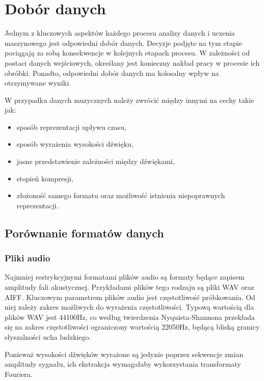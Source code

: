 \chapter {Dobór danych} 
{
    Jednym z kluczowych aspektów każdego procesu analizy danych i uczenia maszynowego
    jest odpowiedni dobór danych. Decyzje podjęte na tym etapie pociągają za sobą 
    konsekwencje w kolejnych etapach procesu. W zależności od postaci danych wejściowych,
    określany jest konieczny nakład pracy w procesie ich obróbki. 
    Ponadto, odpowiedni dobór danych ma kolosalny wpływ na otrzymywane wyniki.

    W przypadku danych muzycznych należy zwrócić między innymi na cechy takie jak:
    \begin{itemize}
        \item sposób reprezentacji upływu czasu,
        \item sposób wyrażenia wysokości dźwięku,
        \item jasne przedstawienie zależności między dźwiękami,
        \item stopień kompresji,
        \item złożoność samego formatu oraz możliwość istnienia niepoprawnych reprezentacji.
    \end{itemize}

    \section{Porównanie formatów danych}
    {
        \subsection{Pliki audio}
        {
            Najmniej restrykcyjnymi formatami plików audio są formaty będące zapisem
            amplitudy fali akustycznej. Przykładami plików tego rodzaju są pliki WAV
            oraz AIFF.
            Kluczowym parametrem plików audio jest częstotliwość próbkowania. Od niej
            zależy zakres możliwych do wyrażenia częstotliwości. Typową wartością dla plików
            WAV jest 44100Hz, co według twierdzenia Nyquista-Shannona przekłada się na zakres
            częstotliwości ograniczony wartością 22050Hz, będącą bliską granicy słyszalności
            ucha ludzkiego. 

            Ponieważ wysokości dźwięków wyrażone są jedynie poprzez sekwencje zmian amplitudy sygnału,
            ich ekstrakcja wymagałaby wykorzystania transformaty Fouriera.

}}}

